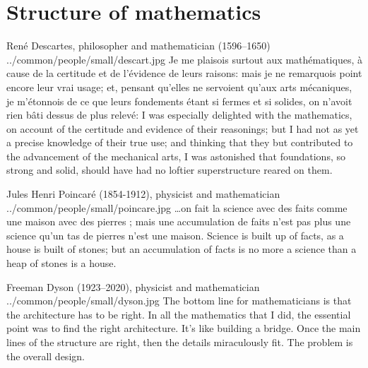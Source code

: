 \section*{Structure of mathematics}
\qboxnpqt
  {Ren\'e Descartes, philosopher and mathematician (1596--1650)
   \footnotemark}
  {../common/people/small/descart.jpg}
  {Je me plaisois surtout aux math\'ematiques,
    \`a cause de la certitude et de l'\'evidence de leurs raisons:
    mais je ne remarquois point encore leur vrai usage;
    et, pensant qu'elles ne servoient qu'aux arts m\'ecaniques,
    je m'\'etonnois de ce que leurs fondements \'etant si fermes et si solides,
    on n'avoit rien b\^ati dessus de plus relev\'e:}
  {I was especially delighted with the mathematics,
    on account of the certitude and evidence of their reasonings;
    but I had not as yet a precise knowledge of their true use;
    and thinking that they but contributed to the advancement of the mechanical arts,
    I was astonished that foundations, so strong and solid,
    should have had no loftier superstructure reared on them.}

\qboxnpqt
  { Jules Henri Poincar\'e (1854-1912), physicist and mathematician
    \footnotemark
  }
  {../common/people/small/poincare.jpg}
  {\ldots on fait la science avec des faits comme une maison avec des pierres ; 
   mais une accumulation de faits n'est pas plus une science qu'un tas de 
   pierres n'est une maison.}
  {Science is built up of facts, as a house is built of stones;
   but an accumulation of facts is no more a science than a heap of stones is a house.}


\qboxnps
  {
    Freeman Dyson (1923--2020), physicist and mathematician  %
    \footnotemark
  }
  {../common/people/small/dyson.jpg}
  {The bottom line for mathematicians is that the architecture has to be right.
    In all the mathematics that I did, the essential point was to find
    the right architecture.
    It's like building a bridge.
    Once the main lines of the structure are right,
    then the details miraculously fit.
    The problem is the overall design.}


